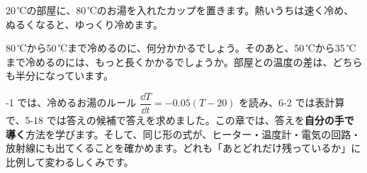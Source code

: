 \begin{hatena}
\noindent\begin{minipage}[c]{0.6\linewidth}\raggedright
20\,℃の部屋に、80\,℃のお湯を入れたカップを置きます。熱いうちは速く冷め、ぬるくなると、ゆっくり冷めます。

80\,℃から50\,℃まで冷めるのに、何分かかるでしょう。そのあと、50\,℃から35\,℃まで冷めるのには、もっと長くかかるでしょうか。部屋との温度の差は、どちらも半分になっています。
\end{minipage}\hfill
\begin{minipage}[c]{0.37\linewidth}\centering
{}
\end{minipage}
\end{hatena}

-1 では、冷めるお湯のルール $\dfrac{\dd T}{\dd t}=-0.05(T-20)$ を読み、6-2 では表計算で、5-18 では答えの候補で答えを求めました。この章では、答えを\textbf{自分の手で導く}方法を学びます。そして、同じ形の式が、ヒーター・温度計・電気の回路・放射線にも出てくることを確かめます。どれも「あとどれだけ残っているか」に比例して変わるしくみです。

